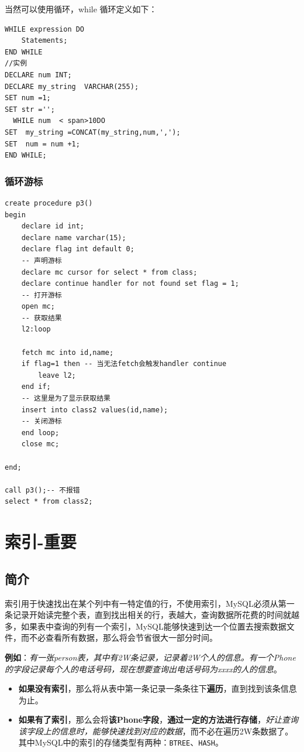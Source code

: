 \documentclass[UTF8,a4paper,12pt]{ctexbook}
\begin{document}
			当然可以使用循环，while 循环定义如下：
			\begin{lstlisting}
WHILE expression DO
    Statements;
END WHILE
//实例
DECLARE num INT;
DECLARE my_string  VARCHAR(255);
SET num =1;
SET str ='';
  WHILE num  < span>10DO
SET  my_string =CONCAT(my_string,num,',');
SET  num = num +1;
END WHILE;		
			\end{lstlisting}
	
		\subsection{循环游标}	
			\begin{lstlisting}
create procedure p3()
begin
    declare id int;
    declare name varchar(15);
    declare flag int default 0;
    -- 声明游标
    declare mc cursor for select * from class;
    declare continue handler for not found set flag = 1;
    -- 打开游标
    open mc;
    -- 获取结果
    l2:loop 
    
    fetch mc into id,name;
    if flag=1 then -- 当无法fetch会触发handler continue
        leave l2;
    end if;
    -- 这里是为了显示获取结果
    insert into class2 values(id,name);
    -- 关闭游标
    end loop;
    close mc;
    
end;

call p3();-- 不报错
select * from class2;	
			\end{lstlisting}
			
	
\chapter{索引-重要}
	\section{简介}
		索引用于快速找出在某个列中有一特定值的行，不使用索引，MySQL必须从第一条记录开始读完整个表，直到找出相关的行，表越大，查询数据所花费的时间就越多，如果表中查询的列有一个索引，MySQL能够快速到达一个位置去搜索数据文件，而不必查看所有数据，那么将会节省很大一部分时间。

		\textbf{例如}：\textit{有一张person表，其中有2W条记录，记录着2W个人的信息。有一个Phone的字段记录每个人的电话号码，现在想要查询出电话号码为xxxx的人的信息}。
			\begin{itemize}
				\item \textbf{如果没有索引}，那么将从表中第一条记录一条条往下\textbf{遍历}，直到找到该条信息为止。
				\item \textbf{如果有了索引}，那么会将\textbf{该Phone字段}，\textbf{通过一定的方法进行存储}，\textit{好让查询该字段上的信息时，能够快速找到对应的数据}，而不必在遍历2W条数据了。其中MySQL中的索引的存储类型有两种：\verb|BTREE|、\verb|HASH|。
			\end{itemize}
\end{document}
